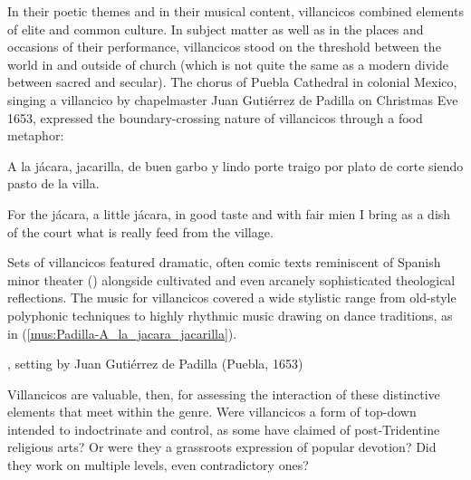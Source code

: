 In their poetic themes and in their musical content, villancicos combined elements of elite and common culture. 
In subject matter as well as in the places and occasions of their performance, villancicos stood on the threshold between the world in and outside of church (which is not quite the same as a modern divide between sacred and secular). 
The chorus of Puebla Cathedral in colonial Mexico, singing a villancico by chapelmaster Juan Gutiérrez de Padilla on Christmas Eve 1653, expressed the boundary-crossing nature of villancicos through a food metaphor:
%
\begin{poemtranslation}
\begin{original}
A la jácara, jacarilla,
de buen garbo y lindo porte
traigo por plato de corte
siendo pasto de la villa.
\end{original}
\begin{translation}
For the jácara, a little jácara,
in good taste and with fair mien
I bring as a dish of the court
what is really feed from the village.
\end{translation}
\end{poemtranslation}
%
Sets of villancicos featured dramatic, often comic texts reminiscent of Spanish minor theater () alongside cultivated and even arcanely sophisticated theological reflections.
The music for villancicos covered a wide stylistic range from old-style polyphonic techniques to highly rhythmic music drawing on dance traditions, as in  (\musicexample \ref{mus:Padilla-A_la_jacara_jacarilla}).

\begin{musicexample}
\caption{, setting by Juan Gutiérrez de Padilla (Puebla, 1653)}
\label{mus:Padilla-A_la_jacara_jacarilla}
\end{musicexample}

Villancicos are valuable, then, for assessing the interaction of these distinctive elements that meet within the genre.
Were villancicos a form of top-down  intended to indoctrinate and control, as some have claimed of post-Tridentine religious arts?
Or were they a grassroots expression of popular devotion? 
Did they work on multiple levels, even contradictory ones?

